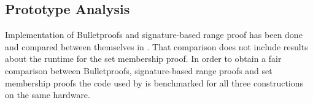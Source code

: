 \subsection{Prototype Analysis}
\label{sec:PrototypeAnalysis}
Implementation of Bulletproofs and signature-based range proof has been done  and compared between themselves in \cite{RANGE-SET}. That comparison  does not include results about the runtime for the set membership proof. In order to obtain a fair comparison between Bulletproofs, signature-based range proofs and set membership proofs the code used by \cite{RANGE-SET} is benchmarked for all three constructions on the same hardware. 

